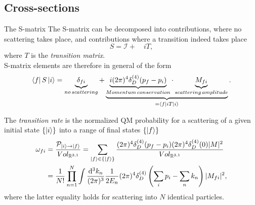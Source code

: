 \subsection{Cross-sections}
\begin{mybox}{The S-matrix}
The S-matrix can be decomposed into contributions, where no scattering takes place, and contributions where a transition indeed takes place
\begin{equation}
S = \mathcal{I} +\quad i T,
\end{equation}
where $T$ is the \emph{transition matrix}.\\
S-matrix elements are therefore in general of the form
\begin{equation}
	\bra{f}S\ket{i} = \underbrace{\delta_{fi}}_{no\, scattering} +\underbrace{\underbrace{i (2 \pi)^4 \delta^{(4)}_D (p_f - p_i) }_{Momentum\, conservation} \cdot \underbrace{M_{fi}}_{scattering\, amplitude}}_{=\bra{f}iT\ket{i}}.
\end{equation}

\end{mybox}
The \emph{transition rate} is the normalized QM probability for a scattering of a given initial state $\{\ket{i}\}$ into a range of final states $\{\ket{f}\}$ 
\begin{align}
	\omega_{fi} &= \frac{\mathcal{P}_{\ket{i}\rightarrow \ket{f}}}{Vol_{\mathbb{R}^{3,1}}} =  \sum_{\ket{f}\in \{\ket{f}\}} \frac{(2\pi)^4 \delta^{(4)}_D (p_f -p_i) (2\pi)^4 \delta^{(4)}_D(0) |M|^2 }{Vol_{\mathbb{R}^{3,1}}} \\
		&= \frac{1}{N!} \prod_{n=1}^{N} \int \frac{\mathrm{d}^3 k_n}{(2\pi)^3} \frac{1}{2 E_n} (2 \pi)^4 \delta^{(4)}_D\left(\sum_i p_i - \sum_n k_n\right) |M_{fi}|^2,
\end{align}
where the latter equality holds for scattering into $N$ identical particles.\\
